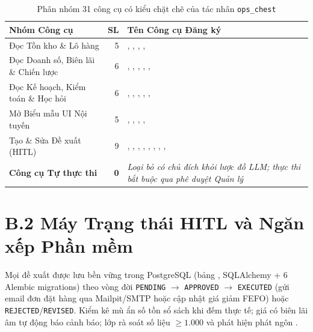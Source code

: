 \begin{table}[H]
\centering
\caption{Phân nhóm 31 công cụ có kiểu chặt chẽ của tác nhân \texttt{ops\_chest}}
\label{tab:ops_tools}
\footnotesize
\begin{tabularx}{\textwidth}{L{3.3cm} r Y}
\toprule
\textbf{Nhóm Công cụ} & \textbf{SL} & \textbf{Tên Công cụ Đăng ký} \\
\midrule
Đọc Tồn kho \& Lô hàng & 5 & , , , ,  \\
Đọc Doanh số, Biên lãi \& Chiến lược & 6 & , , , , ,  \\
Đọc Kế hoạch, Kiểm toán \& Học hỏi & 6 & , , , , ,  \\
Mở Biểu mẫu UI Nội tuyến & 5 & , , , ,  \\
Tạo \& Sửa Đề xuất (HITL) & 9 & , , , , , , , ,  \\
\textbf{Công cụ Tự thực thi} & \textbf{0} & \textit{Loại bỏ có chủ đích khỏi lược đồ LLM; thực thi bắt buộc qua phê duyệt Quản lý} \\
\bottomrule
\end{tabularx}
\end{table}

\section*{B.2 Máy Trạng thái HITL và Ngăn xếp Phần mềm}
Mọi đề xuất được lưu bền vững trong PostgreSQL (bảng , SQLAlchemy + 6 Alembic migrations) theo vòng đời \texttt{PENDING} $\to$ \texttt{APPROVED} $\to$ \texttt{EXECUTED} (gửi email đơn đặt hàng qua Mailpit/SMTP hoặc cập nhật giá giảm FEFO) hoặc \texttt{REJECTED}/\texttt{REVISED}. Kiểm kê mù ẩn số tồn sổ sách khi đếm thực tế; giá có biên lãi âm tự động báo cảnh báo; lớp  rà soát số liệu $\ge 1.000$ và phát hiện phát ngôn .

